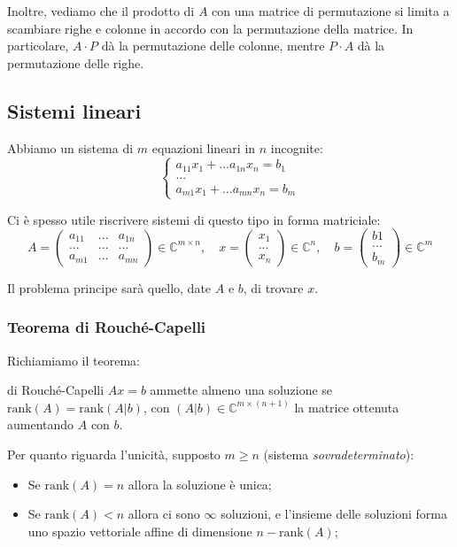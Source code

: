 \documentclass[a4paper,11pt]{article}
\begin{document}
Inoltre, vediamo che il prodotto di $A$ con una matrice di permutazione si limita a scambiare righe e colonne in accordo con la permutazione della matrice.
In particolare, $A \cdot P$ dà la permutazione delle colonne, mentre $P \cdot A$ dà la permutazione delle righe.

\subsection{Sistemi lineari}
Abbiamo un sistema di $m$ equazioni lineari in $n$ incognite:
\[
	\begin{cases}
		a_{11} x_1 + ... a_{1n}	x_n = b_1 \\ 
		... \\
		a_{m1} x_1 + ... a_{mn}	x_n = b_m
	\end{cases}
\]

Ci è spesso utile riscrivere sistemi di questo tipo in forma matriciale:
$$
A = \begin{pmatrix}
	a_{11} & ... & a_{1n} \\ 
	... & ... & ... \\
	a_{m1} & ... & a_{mn}
\end{pmatrix} \in \mathbb{C}^{m \times n}, \quad
x = \begin{pmatrix}
	x_1 \\ ...\\ x_n
\end{pmatrix} \in \mathbb{C}^{n}, \quad
b = \begin{pmatrix}
	b1 \\ ... \\ b_m
\end{pmatrix} \in \mathbb{C}^{m}
$$

Il problema principe sarà quello, date $A$ e $b$, di trovare $x$.

\subsubsection{Teorema di Rouché-Capelli}
Richiamiamo il teorema:
\begin{theorem}{di Rouché-Capelli}
	$Ax = b$ ammette almeno una soluzione se $\mathrm{rank}(A) = \mathrm{rank}(A | b)$, con $(A|b) \in \mathbb{C}^{m \times (n + 1)}$ la matrice ottenuta aumentando $A$ con $b$.

	Per quanto riguarda l'unicità, supposto $m \geq n$ (sistema \textit{sovradeterminato}):
	\begin{itemize}
		\item Se $\mathrm{rank}(A) = n$ allora la soluzione è unica;
		\item Se $\mathrm{rank}(A) < n$ allora ci sono $\infty$ soluzioni, e l'insieme delle soluzioni forma uno spazio vettoriale affine di dimensione $n - \mathrm{rank}(A)$;
	\end{itemize}
\end{theorem}
\end{document}
